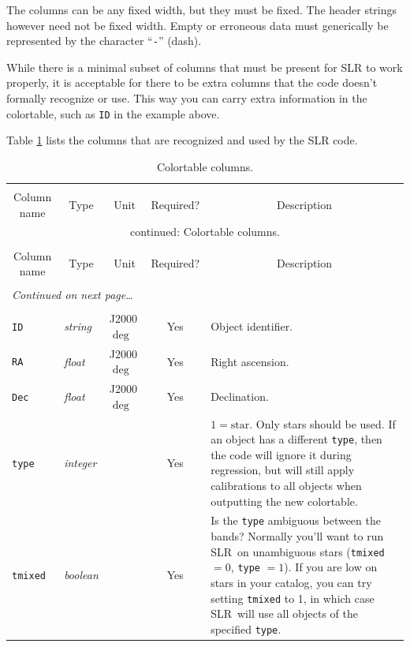 \documentclass{report}
\newcommand{\slr}{SLR}
\begin{document}
The columns can be any fixed width, but they must be fixed.  The
header strings however need not be fixed width.  Empty or erroneous
data must generically be represented by the character ``\verb|-|''
(dash).

While there is a minimal subset of columns that must be present for
SLR to work properly, it is acceptable for there to be extra columns
that the code doesn't formally recognize or use.  This way you can
carry extra information in the colortable, such as \verb|ID| in the
example above.

Table \ref{tab:colortable} lists the columns that are recognized and
used by the SLR code.

\begin{center}
\begin{longtable}{lllcp{2in}}
\caption[Colortable columns.]{Colortable columns.}
\label{tab:colortable} \\
  \hline \hline \\[-2ex]
  \multicolumn{1}{c}{Column name} &
  \multicolumn{1}{c}{Type} &
  \multicolumn{1}{c}{Unit} &
  \multicolumn{1}{c}{Required?} &
  \multicolumn{1}{c}{Description} \\[0.5ex] \hline
\endfirsthead
\multicolumn{5}{c}{{\tablename} \thetable{} continued: Colortable columns.} \\[0.5ex]
  \hline \hline \\[-2ex]
  \multicolumn{1}{c}{Column name} &
  \multicolumn{1}{c}{Type} &
  \multicolumn{1}{c}{Unit} &
  \multicolumn{1}{c}{Required?} &
  \multicolumn{1}{c}{Description} 
\\[0.5ex] \hline
  \\[-1.8ex]
\endhead
\multicolumn{5}{l}{{{\it Continued on next page}\ldots}} \\
\endfoot
  \\[-1.8ex] \hline \hline
\endlastfoot
\verb|ID| & {\it string} & J2000 $\deg$ & Yes & Object identifier. \\
\verb|RA| & {\it float} & J2000 $\deg$ & Yes & Right ascension. \\
\verb|Dec| & {\it float} & J2000 $\deg$ & Yes & Declination. \\
\verb|type| & {\it integer} & & Yes & $1=\textrm{star}$. Only stars should be used. If an object has a different \verb|type|, then the code will ignore it during regression, but will still apply calibrations to all objects when outputting the new colortable. \\
\verb|tmixed| & {\it boolean} & & Yes & Is the \verb|type| ambiguous between the bands? Normally you'll want to run \slr\ on unambiguous stars (\verb|tmixed| $=0$, \verb|type| $=1$). If you are low on stars in your catalog, you can try setting \verb|tmixed| to 1, in which case \slr\ will use all objects of the specified \verb|type|. \\

\end{longtable}
\end{center}
\end{document}
